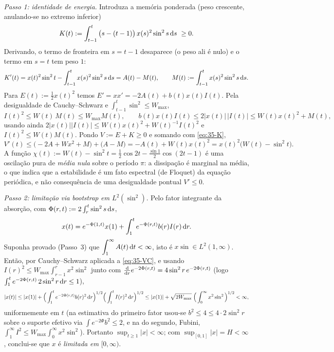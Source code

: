 \emph{Passo 1: identidade de energia.}
Introduza a memória ponderada (peso crescente, anulando-se no extremo inferior)
\[
K(t):=\int_{t-1}^t\big(s-(t-1)\big)\,x(s)^2\sin^2 s\,\mathrm{d} s\ \ge0.
\]
Derivando, o termo de fronteira em $s=t-1$ desaparece (o peso ali é nulo) e o termo em $s=t$ tem peso $1$:
\begin{equation}\label{eq:35-K}
K'(t)=x(t)^2\sin^2 t-\int_{t-1}^t x(s)^2\sin^2 s\,\mathrm{d} s=A(t)-M(t),\qquad M(t):=\int_{t-1}^t x(s)^2\sin^2 s\,\mathrm{d} s.
\end{equation}
Para $E(t):=\tfrac12 x(t)^2$ temos $E'=xx'=-2A(t)+b(t)x(t)I(t)$. Pela desigualdade de Cauchy--Schwarz e $\int_{t-1}^t\sin^2\le W_{\max}$,
\[
I(t)^2\le W(t)\,M(t)\le W_{\max}M(t),\qquad
b(t)x(t)I(t)\le 2|x(t)|\,|I(t)|\le W(t)x(t)^2+M(t),
\]
usando ainda $2|x(t)||I(t)|\le W(t)x(t)^2+W(t)^{-1}I(t)^2$ e $I(t)^2\le W(t)M(t)$. Pondo $V:=E+K\ge0$ e somando com \eqref{eq:35-K},
\begin{equation}\label{eq:35-V}
V'(t)\le\big(-2A+W x^2+M\big)+\big(A-M\big)=-A(t)+W(t)x(t)^2=x(t)^2\big(W(t)-\sin^2 t\big).
\end{equation}
A função $\chi(t):=W(t)-\sin^2 t=\tfrac12\cos 2t-\tfrac{\sin1}{2}\cos(2t-1)$ é uma oscilação pura de \emph{média nula} sobre o período $\pi$: a dissipação é marginal na média, o que indica que a estabilidade é um fato espectral (de Floquet) da equação periódica, e não consequência de uma desigualdade pontual $V'\le0$.

\emph{Passo 2: limitação via bootstrap em $L^2(\sin^2)$.}
Pelo fator integrante da absorção, com $\Phi(r,t):=2\int_r^t\sin^2 s\,\mathrm{d} s$,
\begin{equation}\label{eq:35-VC}
x(t)=e^{-\Phi(1,t)}x(1)+\int_1^t e^{-\Phi(r,t)}b(r)I(r)\,\mathrm{d} r.
\end{equation}
Suponha provado (Passo~3) que $\displaystyle\int_1^\infty A(t)\,\mathrm{d} t<\infty$, isto é $x\sin\in L^2(1,\infty)$. Então, por Cauchy--Schwarz aplicada a \eqref{eq:35-VC}, e usando $I(r)^2\le W_{\max}\int_{r-1}^r x^2\sin^2$ junto com $\frac{\mathrm{d}}{\mathrm{d} r}e^{-2\Phi(r,t)}=4\sin^2 r\,e^{-2\Phi(r,t)}$ (logo $\int_1^t e^{-2\Phi(r,t)}\,2\sin^2 r\,\mathrm{d} r\le1$),
\[
|x(t)|\le |x(1)|+\Big(\int_1^t e^{-2\Phi(r,t)}b(r)^2\,\mathrm{d} r\Big)^{1/2}\Big(\int_1^t I(r)^2\,\mathrm{d} r\Big)^{1/2}
\le |x(1)|+\sqrt{2W_{\max}}\;\Big(\int_0^\infty x^2\sin^2\Big)^{1/2}<\infty,
\]
uniformemente em $t$ (na estimativa do primeiro fator usou-se $b^2\le 4\le 4\cdot 2\sin^2 r$ sobre o suporte efetivo via $\int e^{-2\Phi}b^2\le 2$, e na do segundo, Fubini, $\int_1^\infty I^2\le W_{\max}\int_0^\infty x^2\sin^2$). Portanto $\sup_{t\ge1}|x|<\infty$; com $\sup_{[0,1]}|x|=H<\infty$, conclui-se que $x$ é \emph{limitada em $[0,\infty)$}.

